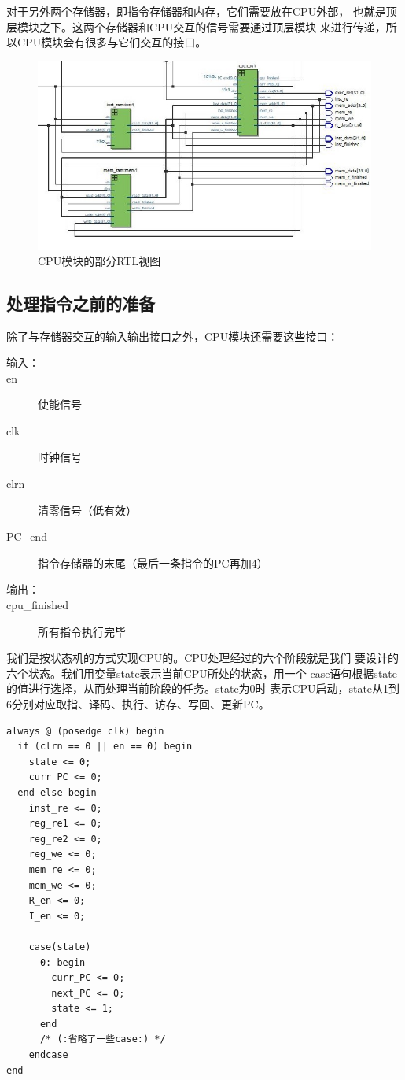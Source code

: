 \documentclass[12pt,a4paper,UTF8]{article}
\begin{document}
对于另外两个存储器，即指令存储器和内存，它们需要放在CPU外部，
也就是顶层模块之下。这两个存储器和CPU交互的信号需要通过顶层模块
来进行传递，所以CPU模块会有很多与它们交互的接口。

\begin{figure}[H]
  \centering
  \includegraphics[width=1\textwidth]{cpu_module.jpg}
  \caption{CPU模块的部分RTL视图}
  \label{cpu_module}
\end{figure}

\subsection{处理指令之前的准备}
除了与存储器交互的输入输出接口之外，CPU模块还需要这些接口：

\begin{description}
  \item[输入：]  \hspace*{\fill}
  \item[en] 使能信号
  \item[clk] 时钟信号
  \item[clrn] 清零信号（低有效）
  \item[PC\_end] 指令存储器的末尾（最后一条指令的PC再加4）
  \item[输出：]
  \item[cpu\_finished] 所有指令执行完毕
\end{description}

我们是按状态机的方式实现CPU的。CPU处理经过的六个阶段就是我们
要设计的六个状态。我们用变量state表示当前CPU所处的状态，用一个
case语句根据state的值进行选择，从而处理当前阶段的任务。state为0时
表示CPU启动，state从1到6分别对应取指、译码、执行、访存、写回、更新PC。

\begin{lstlisting}[style=verilog-style]
always @ (posedge clk) begin
  if (clrn == 0 || en == 0) begin
    state <= 0;
    curr_PC <= 0;
  end else begin
    inst_re <= 0;
    reg_re1 <= 0;
    reg_re2 <= 0;
    reg_we <= 0;
    mem_re <= 0;
    mem_we <= 0;
    R_en <= 0;
    I_en <= 0;

    case(state)
      0: begin
        curr_PC <= 0;
        next_PC <= 0;            
        state <= 1;
      end
      /* (:省略了一些case:) */
    endcase
end
\end{lstlisting}
\end{document}

